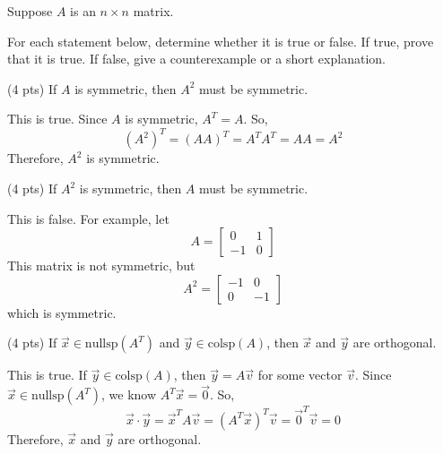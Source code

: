 \documentclass[11pt]{article}
\begin{document}
\newpage

\begin{prob}[(12 pts)]
Suppose $A$ is an $n \times n$ matrix.

For each statement below, determine whether it is true or false. If true, prove that it is true. If false, give a counterexample or a short explanation.

\begin{subprob}(4 pts) If $A$ is symmetric, then $A^2$ must be symmetric.

   

  \par\noindent\emptybox{5cm}

  \begin{solution}
  This is true. Since $A$ is symmetric, $A^T = A$. So,
  \[
  (A^2)^T = (AA)^T = A^T A^T = AA = A^2
  \]
  Therefore, $A^2$ is symmetric.
  \end{solution}

\end{subprob}

\begin{subprob}(4 pts) If $A^2$ is symmetric, then $A$ must be symmetric.

   

  \par\noindent\emptybox{5cm}

  \begin{solution}
  This is false. For example, let
  \[
  A =
  \begin{bmatrix}
  0 & 1 \\
  -1 & 0
  \end{bmatrix}
  \]
  This matrix is not symmetric, but
  \[
  A^2 =
  \begin{bmatrix}
  -1 & 0 \\
  0 & -1
  \end{bmatrix}
  \]
  which is symmetric.
  \end{solution}
\end{subprob}

\begin{subprob}(4 pts) If $\vec x \in \text{nullsp}(A^T)$ and $\vec y \in \text{colsp}(A)$, then $\vec x$ and $\vec y$ are orthogonal. \\
   

  \par\noindent\emptybox{5cm}

  \begin{solution}
  This is true. If $\vec y \in \text{colsp}(A)$, then $\vec y = A\vec v$ for some vector $\vec v$. Since $\vec x \in \text{nullsp}(A^T)$, we know $A^T \vec x = \vec 0$. So,
  \[
  \vec x \cdot \vec y
  =
  \vec x^T A \vec v
  =
  (A^T \vec x)^T \vec v
  =
  \vec 0^T \vec v
  =
  0
  \]
  Therefore, $\vec x$ and $\vec y$ are orthogonal.
  \end{solution}

\end{subprob}

\end{prob}
\end{document}
